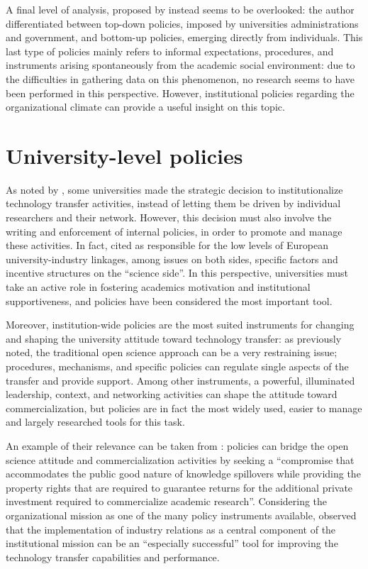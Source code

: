 A final level of analysis, proposed by \citet{Rasmussen2006} instead seems to be overlooked: the author differentiated between top-down policies, imposed by universities administrations and government, and bottom-up policies, emerging directly from individuals. This last type of policies mainly refers to informal expectations, procedures, and instruments arising spontaneously from the academic social environment: due to the difficulties in gathering data on this phenomenon, no research seems to have been performed in this perspective. However, institutional policies regarding the organizational climate can provide a useful insight on this topic.

\section{University-level policies}

As noted by \citet{Geuna2009}, some universities made the strategic decision to institutionalize technology transfer activities, instead of letting them be driven by individual researchers and their network. However, this decision must also involve the writing and enforcement of internal policies, in order to promote and manage these activities. In fact, \citet{Debackere2005} cited as responsible for the low levels of European university-industry linkages, among issues on both sides, specific factors and incentive structures on the \enquote{science side}. In this perspective, universities must take an active role in fostering academics motivation and institutional supportiveness, and policies have been considered the most important tool.

Moreover, institution-wide policies are the most suited instruments for changing and shaping the university attitude toward technology transfer: as previously noted, the traditional open science approach can be a very restraining issue; procedures, mechanisms, and specific policies can regulate single aspects of the transfer and  provide support. Among other instruments, a powerful, illuminated leadership, context, and networking activities can shape the attitude toward commercialization, but policies are in fact the most widely used, easier to manage and largely researched tools for this task. 

An example of their relevance can be taken from \citet{Bercovitz2006}: policies can bridge the open science attitude and commercialization activities by seeking a \enquote{compromise that accommodates the public good nature of knowledge spillovers while providing the property rights that are required to guarantee returns for the additional private investment required to commercialize academic research}.  Considering the organizational mission as one of the many policy instruments available, \citet{Debackere2005} observed that the implementation of industry relations as a central component of the institutional mission can be an \enquote{especially successful} tool for improving the technology transfer capabilities and performance. 

